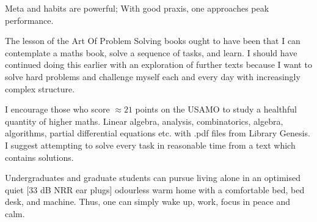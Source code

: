 Meta and habits are powerful; With good praxis, one approaches peak performance.

The lesson of the Art Of Problem Solving books ought to have been that I can contemplate a maths book, solve a sequence of tasks, and learn. I should have continued doing this earlier with an exploration of further texts because I want to solve hard problems and challenge myself each and every day with increasingly complex structure.

I encourage those who score $\approx 21$ points on the USAMO to study a healthful quantity of higher maths. Linear algebra, analysis, combinatorics, algebra, algorithms, partial differential equations etc. with .pdf files from Library Genesis. I suggest attempting to solve every task in reasonable time from a text which contains solutions.

Undergraduates and graduate students can pursue living alone in an optimised quiet [$33$ dB NRR ear plugs] odourless warm home with a comfortable bed, bed desk, and machine. Thus, one can simply wake up, work, focus in peace and calm.